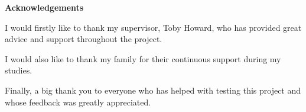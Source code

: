 \vspace*{\fill}

\begin{center}
    \textbf{Acknowledgements}   
\end{center}

I would firstly like to thank my supervisor, Toby Howard, who has provided great advice and support throughout the project. 

I would also like to thank my family for their continuous support during my studies.

Finally, a big thank you to everyone who has helped with testing this project and whose feedback was greatly appreciated.

\vspace*{\fill}